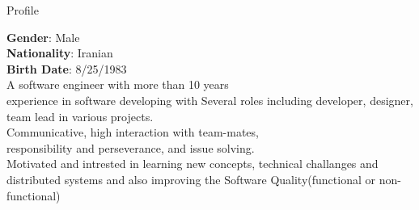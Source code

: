 
\begin{jrsection}[location = sidebar]{Profile}
    \begin{jrdescription}
        {\bfseries Gender}: Male \\
        {\bfseries Nationality}: Iranian \\
        {\bfseries Birth Date}: 8/25/1983 \\
    A software engineer with more than 10 years  \\
    experience in software developing with Several roles including developer, designer, team lead in various projects.\\
    Communicative, high interaction with team-mates,\\
    responsibility and perseverance, and issue solving.\\
    Motivated and intrested in learning new concepts, technical challanges and distributed
    systems and also improving the Software Quality(functional or non-functional)\\
    \end{jrdescription}
\end{jrsection}
